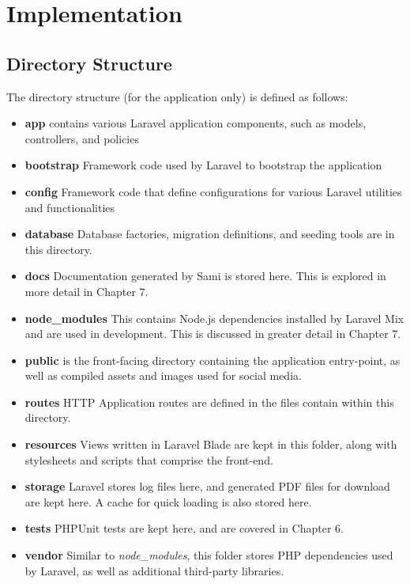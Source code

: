 \chapter{Implementation}

\section{Directory Structure}
The directory structure (for the application only) is defined as follows:

\begin{itemize}
    \item \textbf{app} contains various Laravel application components, such as models, controllers, and policies
    \item \textbf{bootstrap} Framework code used by Laravel to bootstrap the application
    \item \textbf{config} Framework code that define configurations for various Laravel utilities and functionalities
    \item \textbf{database} Database factories, migration definitions, and seeding tools are in this directory.
    \item \textbf{docs} Documentation generated by Sami is stored here. This is explored in more detail in Chapter 7.
    \item \textbf{node\_modules} This contains Node.js dependencies installed by Laravel Mix and are used in development. This is discussed in greater detail in Chapter 7.
    \item \textbf{public} is the front-facing directory containing the application entry-point, as well as compiled assets and images used for social media.
    \item \textbf{routes} HTTP Application routes are defined in the files contain within this directory.
    \item \textbf{resources} Views written in Laravel Blade are kept in this folder, along with stylesheets and scripts that comprise the front-end.
    \item \textbf{storage} Laravel stores log files here, and generated PDF files for download are kept here. A cache for quick loading is also stored here.
    \item \textbf{tests} PHPUnit tests are kept here, and are covered in Chapter 6.
    \item \textbf{vendor} Similar to \textit{node\_modules}, this folder stores PHP dependencies used by Laravel, as well as additional third-party libraries.
\end{itemize} \cite{W3Schools1}

